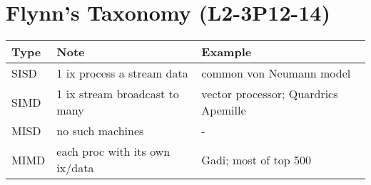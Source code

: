 \section*{Flynn's Taxonomy (\textbf{L2-3P12-14})}
\begin{tabular}{l|p{4cm}p{4cm}}
  \hline
  Type & Note & Example \\
  \hline
  SISD & 1 ix process a stream data  & common von Neumann model \\
  SIMD & 1 ix stream broadcast to many & vector processor; Quardrics Apemille \\
  MISD & no such machines  & - \\
  MIMD & each proc with its own ix/data & Gadi; most of top 500 \\
  \hline
\end{tabular}
